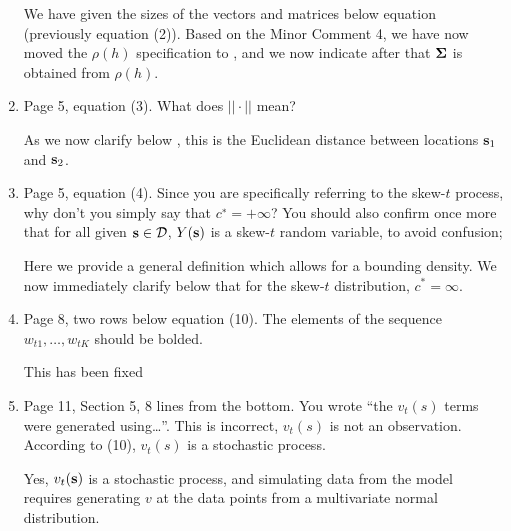\documentclass[11pt]{article}
\begin{document}
\begin{enumerate}[1.]
  \begin{response}
    We have given the sizes of the vectors and matrices below equation  (previously equation (2)). Based on the Minor Comment 4, we have now moved the $\rho(h)$ specification to , and we now indicate after  that $\mbox{\boldmath $\Sigma$}$ is obtained from $\rho(h)$.
  \end{response}

  \item Page 5, equation (3). What does $|| \cdot ||$ mean? \\

  \begin{response}
    As we now clarify below , this is the Euclidean distance between locations $\mbox{\bf s}_1$ and $\mbox{\bf s}_2$.
  \end{response}

  \item Page 5, equation (4). Since you are specifically referring to the skew-$t$ process, why don't you simply say that $c^∗ = +\infty$? You should also confirm once more that for all given $\mbox{\bf s} \in {\cal D}$, $Y(\mbox{\bf s})$ is a skew-$t$ random variable, to avoid confusion; \\

  \begin{response}
    Here we provide a general definition which allows for a bounding density.
    We now immediately clarify below  that for the skew-$t$ distribution, $c^* = \infty$.
  \end{response}

  \item Page 8, two rows below equation (10). The elements of the sequence $w_{t1}, \ldots , w_{tK}$ should be bolded. \\

  \begin{response}
    This has been fixed
  \end{response}

  \item Page 11, Section 5, 8 lines from the bottom. You wrote ``the $v_t(s)$ terms were generated using\ldots ''. This is incorrect, $v_t(s)$ is not an observation. According to (10), $v_t(s)$ is a stochastic process. \\

  \begin{response}
    Yes, $v_t(\mbox{\bf s})$ is a stochastic process, and simulating data from the model requires generating $v$ at the data points from a multivariate normal distribution.
  \end{response}


\end{enumerate}
\end{document}
